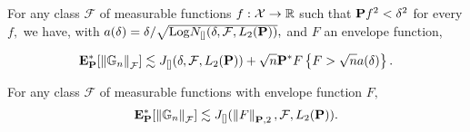 \begin{lemma}
  For any class 
  $\mathcal{F}$
  of measurable functions 
  $
    f:
    \mathcal{X}
    \to \R
  $
  such that 
  $
    \P f^2
    <
    \delta^2
  $
  for every $f,$
  we have,
  with
  $
    a(\delta)
    =
    \delta
    /
    \sqrt{
      \mathrm{Log}
    N
    _{[]}
    (
    \delta
    ,
    \mathcal{F}
    ,
    L_2(\P)
    )
    }
    ,
  $
  and $F$
  an envelope function,

  \begin{gather}
    \E^*
    _\P
    [
    \norm{
      \G
      _n
      }
      _\mathcal{F}
    ]
    \lesssim
    J
    _{[]}
    (
      \delta
    ,
    \mathcal{F}
    ,
    L_2(\P)
    )
    +
    \sqrt{n}
    \P^*
    F
    \left\{ 
      F > \sqrt{n}
      a(\delta)
    \right\}
    .
  \end{gather}
\end{lemma}


\begin{corollary}
  For any class $\mathcal{F}$ of measurable functions with envelope function $F,$
  \begin{gather}
    \E^*
    _\P
    [
    \norm{
      \G
      _n
      }
      _\mathcal{F}
    ]
    \lesssim
    J
    _{[]}
    (
    \norm{
      F
    }
    _{\P,2}
    ,
    \mathcal{F}
    ,
    L_2(\P)
    )
    .
  \end{gather}
\end{corollary}



